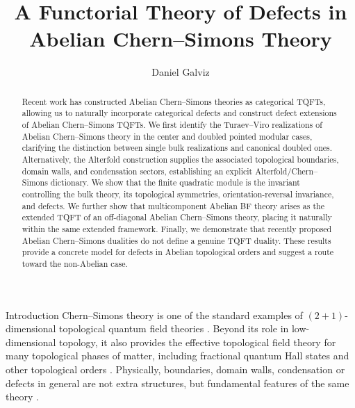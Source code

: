 \documentclass[12pt]{amsart}
\title[A Functorial Theory of Defects in Abelian Chern--Simons Theory]
{\fontsize{11pt}{13pt}\selectfont A Functorial Theory of Defects in\\Abelian Chern--Simons Theory}
\author{Daniel Galviz}
\date{}
\makeatletter
\renewcommand\section{\@startsection{section}{1}%
  \z@{.7\linespacing\@plus\linespacing}{.5\linespacing}%
  {\normalfont\bfseries\centering}}
\numberwithin{equation}{section}
\theoremstyle{definition}
\makeatother
\begin{document}
\begin{abstract}
Recent work has constructed Abelian Chern--Simons theories as categorical TQFTs, allowing us to naturally incorporate categorical defects and construct defect extensions of Abelian Chern--Simons TQFTs. We first identify the Turaev--Viro realizations of Abelian Chern--Simons theory in the center and doubled pointed modular cases, clarifying the distinction between single bulk realizations and canonical doubled ones. Alternatively, the Alterfold construction supplies the associated topological boundaries, domain walls, and condensation sectors, establishing an explicit Alterfold/Chern--Simons dictionary. We show that the finite quadratic module is the invariant controlling the bulk theory, its topological symmetries, orientation-reversal invariance, and defects. We further show that multicomponent Abelian BF theory arises as the extended TQFT of an off-diagonal Abelian Chern--Simons theory,  placing it naturally within the same  extended framework. Finally, we demonstrate that recently proposed Abelian Chern--Simons dualities do not define a genuine TQFT duality. These results provide a concrete model for defects in Abelian topological orders and suggest a route toward the non-Abelian case. 
\end{abstract}


\maketitle
{\scriptsize
\setlength{\parskip}{0pt}
\hypersetup{linkcolor=black}
\setcounter{tocdepth}{1}
\tableofcontents
}
\newpage

\section{Introduction}
Chern--Simons theory is one of the standard examples of $(2+1)$-dimensional topological quantum field theories \cite{Witten:1988,Freed:1991,FreedCS,Manoliu3}.  Beyond its role in low-dimensional topology, it also provides the effective topological field theory for many topological phases of matter, including fractional quantum Hall states and other topological orders \cite{wen1992,wenzee1992,Wen2016}.  Physically, boundaries, domain walls, condensation or defects in general are not extra structures, but fundamental features of the same theory \cite{LevinWen05,kitaev2012models,BJQ2013,kong2014anyon}.  
\end{document}

